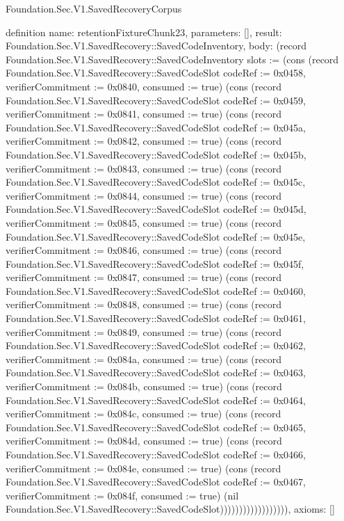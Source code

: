 \begin{lexlean}{Foundation.Sec.V1.SavedRecoveryCorpus}
\begin{semanticmodule}
definition{
  name: retentionFixtureChunk23,
  parameters: [],
  result: Foundation.Sec.V1.SavedRecovery::SavedCodeInventory,
  body: (record Foundation.Sec.V1.SavedRecovery::SavedCodeInventory {slots := (cons (record Foundation.Sec.V1.SavedRecovery::SavedCodeSlot {codeRef := 0x0458, verifierCommitment := 0x0840, consumed := true}) (cons (record Foundation.Sec.V1.SavedRecovery::SavedCodeSlot {codeRef := 0x0459, verifierCommitment := 0x0841, consumed := true}) (cons (record Foundation.Sec.V1.SavedRecovery::SavedCodeSlot {codeRef := 0x045a, verifierCommitment := 0x0842, consumed := true}) (cons (record Foundation.Sec.V1.SavedRecovery::SavedCodeSlot {codeRef := 0x045b, verifierCommitment := 0x0843, consumed := true}) (cons (record Foundation.Sec.V1.SavedRecovery::SavedCodeSlot {codeRef := 0x045c, verifierCommitment := 0x0844, consumed := true}) (cons (record Foundation.Sec.V1.SavedRecovery::SavedCodeSlot {codeRef := 0x045d, verifierCommitment := 0x0845, consumed := true}) (cons (record Foundation.Sec.V1.SavedRecovery::SavedCodeSlot {codeRef := 0x045e, verifierCommitment := 0x0846, consumed := true}) (cons (record Foundation.Sec.V1.SavedRecovery::SavedCodeSlot {codeRef := 0x045f, verifierCommitment := 0x0847, consumed := true}) (cons (record Foundation.Sec.V1.SavedRecovery::SavedCodeSlot {codeRef := 0x0460, verifierCommitment := 0x0848, consumed := true}) (cons (record Foundation.Sec.V1.SavedRecovery::SavedCodeSlot {codeRef := 0x0461, verifierCommitment := 0x0849, consumed := true}) (cons (record Foundation.Sec.V1.SavedRecovery::SavedCodeSlot {codeRef := 0x0462, verifierCommitment := 0x084a, consumed := true}) (cons (record Foundation.Sec.V1.SavedRecovery::SavedCodeSlot {codeRef := 0x0463, verifierCommitment := 0x084b, consumed := true}) (cons (record Foundation.Sec.V1.SavedRecovery::SavedCodeSlot {codeRef := 0x0464, verifierCommitment := 0x084c, consumed := true}) (cons (record Foundation.Sec.V1.SavedRecovery::SavedCodeSlot {codeRef := 0x0465, verifierCommitment := 0x084d, consumed := true}) (cons (record Foundation.Sec.V1.SavedRecovery::SavedCodeSlot {codeRef := 0x0466, verifierCommitment := 0x084e, consumed := true}) (cons (record Foundation.Sec.V1.SavedRecovery::SavedCodeSlot {codeRef := 0x0467, verifierCommitment := 0x084f, consumed := true}) (nil Foundation.Sec.V1.SavedRecovery::SavedCodeSlot)))))))))))))))))}),
  axioms: []
}


\end{semanticmodule}
\end{lexlean}
